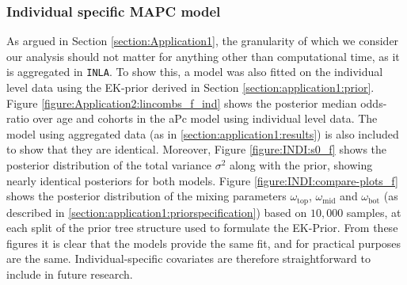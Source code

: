\subsubsection{Individual specific MAPC model}
\label{appendix:individual}
As argued in Section \ref{section:Application1}, the granularity of which we consider our analysis should not matter for anything other than computational time, as it is aggregated in \texttt{INLA}. To show this, a model was also fitted on the individual level data using the EK-prior derived in Section \ref{section:application1:prior}. Figure \ref{figure:Application2:lincombs_f_ind} shows the posterior median odds-ratio over age and cohorts in the aPc model using individual level data. The model using aggregated data (as in \ref{section:application1:results}) is also included to show that they are identical. Moreover, Figure \ref{figure:INDI:s0_f} shows the posterior distribution of the total variance $\sigma^2$ along with the prior, showing nearly identical posteriors for both models. Figure \ref{figure:INDI:compare-plots_f} shows the posterior distribution of the mixing parameters $\omega_{\text{top}}$, $\omega_{\text{mid}}$ and $\omega_{\text{bot}}$ (as described in \ref{section:application1:priorspecification}) based on $10,000$ samples, at each split of the prior tree structure used to formulate the EK-Prior. From these figures it is clear that the models provide the same fit, and for practical purposes are the same. Individual-specific covariates are therefore straightforward to include in future research.

